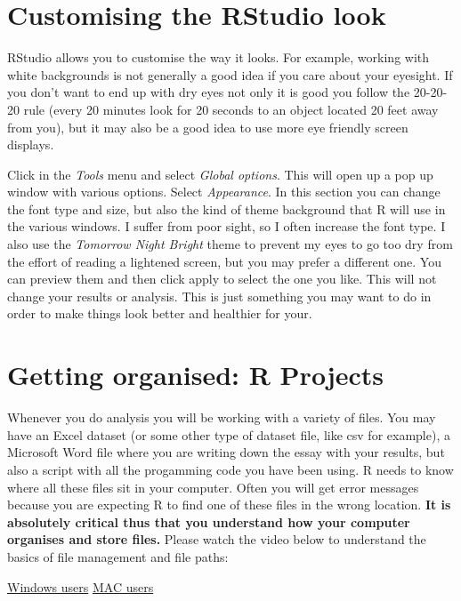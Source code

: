 \documentclass[
]{book}
\begin{document}
\hypertarget{customising-the-rstudio-look}{%
\section{Customising the RStudio look}\label{customising-the-rstudio-look}}

RStudio allows you to customise the way it looks. For example, working with white backgrounds is not generally a good idea if you care about your eyesight. If you don't want to end up with dry eyes not only it is good you follow the 20-20-20 rule (every 20 minutes look for 20 seconds to an object located 20 feet away from you), but it may also be a good idea to use more eye friendly screen displays.

Click in the \emph{Tools} menu and select \emph{Global options}. This will open up a pop up window with various options. Select \emph{Appearance}. In this section you can change the font type and size, but also the kind of theme background that R will use in the various windows. I suffer from poor sight, so I often increase the font type. I also use the \emph{Tomorrow Night Bright} theme to prevent my eyes to go too dry from the effort of reading a lightened screen, but you may prefer a different one. You can preview them and then click apply to select the one you like. This will not change your results or analysis. This is just something you may want to do in order to make things look better and healthier for your.

\hypertarget{getting-organised-r-projects}{%
\section{Getting organised: R Projects}\label{getting-organised-r-projects}}

Whenever you do analysis you will be working with a variety of files. You may have an Excel dataset (or some other type of dataset file, like csv for example), a Microsoft Word file where you are writing down the essay with your results, but also a script with all the progamming code you have been using. R needs to know where all these files sit in your computer. Often you will get error messages because you are expecting R to find one of these files in the wrong location. \textbf{It is absolutely critical thus that you understand how your computer organises and store files.} Please watch the video below to understand the basics of file management and file paths:

\href{https://www.top-windows-tutorials.com/file-paths/}{Windows users}
\href{https://www.switchingtomac.com/tutorials/osx/5-ways-to-reveal-the-path-of-a-file-on-macos/}{MAC users}
\end{document}
